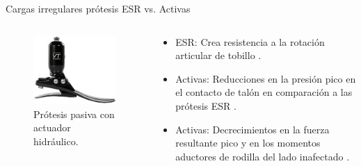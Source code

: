 \documentclass[10pt]{beamer}
\begin{document}
\begin{frame}{Cargas irregulares prótesis ESR vs. Activas}

\begin{columns}[t]


\column{60 mm}

\begin{figure}
\begin{centering}
\includegraphics[scale=0.4]{Feathergraphics/echelon}
\par\end{centering}
\caption{Prótesis pasiva con actuador hidráulico.\cite{springking}}
\end{figure}


\column{60 mm}
\begin{exampleblock}{}

\begin{itemize}
\item {\footnotesize{}ESR: Crea resistencia a la rotación articular de tobillo
\cite{DeAsha2014}.}{\footnotesize \par}
\item {\footnotesize{}Activas: Reducciones en la presión pico en el contacto
de talón en comparación a las prótesis ESR \cite{Hill2013a}.}{\footnotesize \par}
\item {\footnotesize{}Activas: Decrecimientos en la fuerza resultante pico
y en los momentos aductores de rodilla del lado inafectado \cite{Grabowski2013}.}{\footnotesize \par}
\end{itemize}
\end{exampleblock}
\end{columns}

\end{frame}
\end{document}
